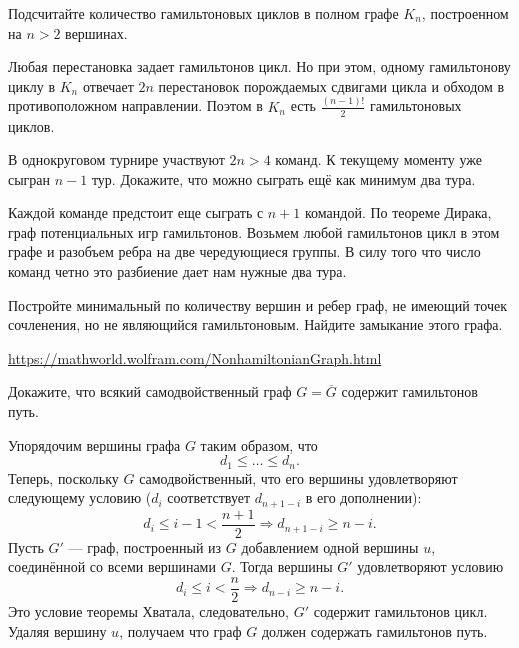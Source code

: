 \documentclass[a4paper,12pt,twoside]{article}
\begin{document}
\begin{?}
    Подсчитайте количество гамильтоновых циклов в полном графе $K_n$, построенном на $n > 2$ вершинах.
\end{?}
\begin{solution}{}
    Любая перестановка задает гамильтонов цикл. Но при этом, одному гамильтонову циклу в \(K_n\) отвечает \(2n\) перестановок порождаемых сдвигами цикла и обходом в противоположном направлении. Поэтом в \(K_n\) есть \(\frac{(n-1)!}{2}\) гамильтоновых циклов.
\end{solution}
\begin{?}
    В однокруговом турнире участвуют $2n > 4$ команд. К текущему моменту уже сыгран $n - 1$ тур. Докажите, что можно сыграть ещё как минимум два тура.
\end{?}
\begin{solution}{}
    Каждой команде предстоит еще сыграть с \(n+1\) командой. По теореме Дирака, граф потенциальных игр гамильтонов. Возьмем любой гамильтонов цикл в этом графе и разобъем ребра на две чередующиеся группы. В силу того что число команд четно это разбиение дает нам нужные два тура.
\end{solution}
\begin{?}
    Постройте минимальный по количеству вершин и ребер граф, не имеющий точек сочленения, но не являющийся гамильтоновым. Найдите замыкание этого графа.
\end{?}
\begin{solution}{}
    \url{https://mathworld.wolfram.com/NonhamiltonianGraph.html}
\end{solution}
\begin{?}
    Докажите, что всякий самодвойственный граф \(G = \overline{G}\) содержит гамильтонов путь.
\end{?}
\begin{solution}{}
    Упорядочим вершины графа \(G\) таким образом, что
    \[
        d_{1} \leq \ldots \leq d_{n}.
    \]
    Теперь, поскольку \(G\) самодвойственный, что его вершины удовлетворяют следующему условию (\(d_{i}\) соответствует \(d_{n+1-i}\) в его дополнении):
    \[
        d_{i} \leq i - 1 < \frac{n + 1}{2} \Rightarrow d_{n + 1 - i} \geq n - i.
    \]
    Пусть \(G'\) --- граф, построенный из \(G\) добавлением одной вершины \(u\), соединённой со всеми вершинами \(G\). Тогда вершины \(G'\) удовлетворяют условию
    \[
        d_{i} \leq i < \frac{n}{2} \Rightarrow d_{n - i} \geq n - i.
    \]
    Это условие теоремы Хватала, следовательно, \(G'\) содержит гамильтонов цикл. Удаляя вершину \(u\), получаем что граф \(G\) должен содержать гамильтонов путь.
\end{solution}
\end{document}
